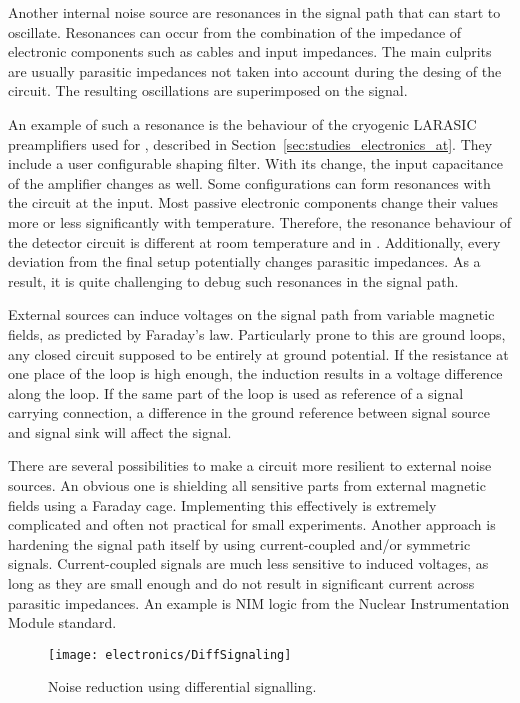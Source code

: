 Another internal noise source are resonances in the signal path that can start to oscillate.
Resonances can occur from the combination of the impedance of electronic components such as cables and input impedances.
The main culprits are usually parasitic impedances not taken into account during the desing of the circuit.
The resulting oscillations are superimposed on the signal.

An example of such a resonance is the behaviour of the cryogenic LARASIC preamplifiers used for \AT{}, described in Section~\ref{sec:studies_electronics_at}.
They include a user configurable shaping filter.
With its change, the input capacitance of the amplifier changes as well.
Some configurations can form resonances with the circuit at the input.
Most passive electronic components change their values more or less significantly with temperature.
Therefore, the resonance behaviour of the detector circuit is different at room temperature and in \lar{}.
Additionally, every deviation from the final setup potentially changes parasitic impedances.
As a result, it is quite challenging to debug such resonances in the signal path.

External sources can induce voltages on the signal path from variable magnetic fields, as predicted by Faraday's law.
Particularly prone to this are ground loops, any closed circuit supposed to be entirely at ground potential.
If the resistance at one place of the loop is high enough, the induction results in a voltage difference along the loop.
If the same part of the loop is used as reference of a signal carrying connection, a difference in the ground reference between signal source and signal sink will affect the signal.

There are several possibilities to make a circuit more resilient to external noise sources.
An obvious one is shielding all sensitive parts from external magnetic fields using a Faraday cage.
Implementing this effectively is extremely complicated and often not practical for small experiments.
Another approach is hardening the signal path itself by using current-coupled and/or symmetric signals.
Current-coupled signals are much less sensitive to induced voltages, as long as they are small enough and do not result in significant current across parasitic impedances.
An example is NIM logic from the Nuclear Instrumentation Module standard.

\begin{figure}[htb]
	\centering
	\texttt{[image: electronics/DiffSignaling]}
	\caption{Noise reduction using differential signalling.~\cite{diff_signal}}
	\label{fig:electronics_diff-signal}
\end{figure}

